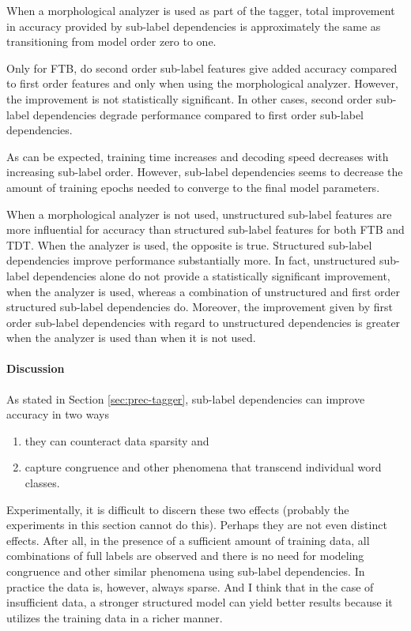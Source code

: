 When a morphological analyzer is used as part of the tagger, total
improvement in accuracy provided by sub-label dependencies is
approximately the same as transitioning from model order zero to one.

Only for FTB, do second order sub-label features give added accuracy
compared to first order features and only when using the morphological
analyzer. However, the improvement is not statistically
significant. In other cases, second order sub-label dependencies
degrade performance compared to first order sub-label dependencies.

As can be expected, training time increases and decoding speed
decreases with increasing sub-label order. However, sub-label
dependencies seems to decrease the amount of training epochs needed to
converge to the final model parameters.

When a morphological analyzer is not used, unstructured sub-label
features are more influential for accuracy than structured sub-label
features for both FTB and TDT.  When the analyzer is used, the
opposite is true. Structured sub-label dependencies improve
performance substantially more. In fact, unstructured sub-label
dependencies alone do not provide a statistically significant
improvement, when the analyzer is used, whereas a combination of
unstructured and first order structured sub-label dependencies
do. Moreover, the improvement given by first order sub-label
dependencies with regard to unstructured dependencies is greater when
the analyzer is used than when it is not used.

\paragraph{Discussion} As stated in Section \ref{sec:prec-tagger}, sub-label dependencies can improve accuracy in two ways
\begin{enumerate}
\item they can counteract data sparsity and
\item capture congruence and other phenomena that transcend individual
  word classes.
\end{enumerate}
Experimentally, it is difficult to discern these two effects (probably
the experiments in this section cannot do this). Perhaps they are not
even distinct effects. After all, in the presence of a sufficient
amount of training data, all combinations of full labels are observed
and there is no need for modeling congruence and other similar
phenomena using sub-label dependencies. In practice the data is,
however, always sparse. And I think that in the case of insufficient
data, a stronger structured model can yield better results because it
utilizes the training data in a richer manner.

